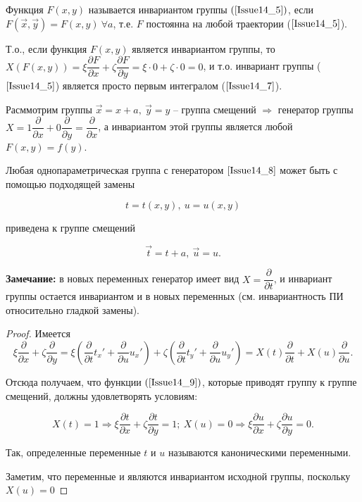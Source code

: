 \begin{definition}
Функция $F(x,y)$ называется $\textbf{инвариантом группы}$ $(\ref{Issue14_5})$, если \
$F(\vec{x}, \vec{y}) = F(x,y)\  \forall a$, т.е. $F$ постоянна на любой траектории ($\ref{Issue14_5}$).
\end{definition}


Т.о., если функция $F(x,y)$ является инвариантом группы, то $X(F(x,y)) = \xi \dfrac{\partial F}{\partial x} + \zeta \dfrac{\partial F}{\partial y} = \xi \cdot 0 + \zeta \cdot 0 = 0$, и т.о. инвариант группы ($\ref{Issue14_5}$) является просто первым интегралом ($\ref{Issue14_7}$).

Расммотрим группы $\vec{x} = x + a,\ \vec{y} = y$ -- группа смещений $\Rightarrow$ генератор группы $X = 1 \dfrac{\partial}{\partial x} + 0 \dfrac{\partial}{\partial y} = \dfrac{\partial}{\partial x}$, а инвариантом этой группы является любой $F(x,y) = f(y)$.

\begin{theorem}
Любая однопараметрическая группа с генератором $\ref{Issue14_8}$ может быть с помощью подходящей замены 

\begin{equation}
	t = t(x,y),\ u = u(x,y)
	\label{Issue14_9}
\end{equation}

приведена к группе смещений 

\begin{equation}
	\vec{t} = t + a,\ \vec{u} = u.
	\label{Issue14_10}
\end{equation}

\textbf{Замечание:} в новых переменных генератор имеет вид $X = \dfrac{\partial}{\partial t}$, и инвариант группы остается инвариантом и в новых переменных (см. инвариантность ПИ относительно гладкой замены).

\begin{proof}

Имеется \[\xi \dfrac{\partial}{\partial x} + \zeta \dfrac{\partial}{\partial y} = \xi(\dfrac{\partial}{\partial t}t_x' + \dfrac{\partial}{\partial u}u_x') + \zeta(\dfrac{\partial}{\partial t}t_y' + \dfrac{\partial}{\partial u}u_y') = X(t)\dfrac{\partial}{\partial t} + X(u)\dfrac{\partial}{\partial u}.\]

Отсюда получаем, что функции $(\ref{Issue14_9})$, которые приводят группу к группе смещений, должны удовлетворять условиям:

\begin{equation}
	X(t) = 1 \Rightarrow \xi \dfrac{\partial t}{\partial x} + \zeta \dfrac{\partial t}{\partial y} = 1;\ X(u) = 0 \Rightarrow \xi \dfrac{\partial u}{\partial x} + \zeta \dfrac{\partial u}{\partial y} = 0.
	\label{Issue14_11}
\end{equation}

Так, определенные переменные $t$ и $u$ называются $\textbf{каноническими переменными}$.

Заметим, что переменные и являются инвариантом исходной группы, поскольку \\
 $X(u) = 0$

\end{proof}
\end{theorem} 


